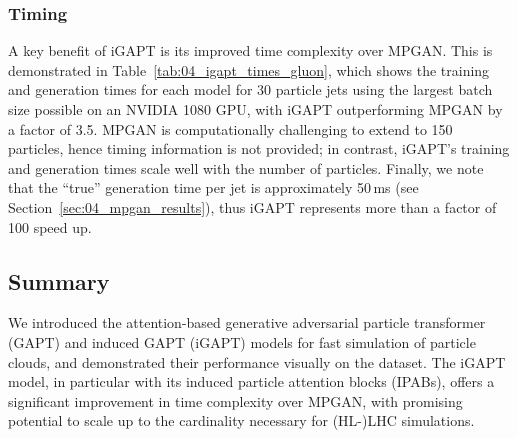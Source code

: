 \subsubsection{Timing} 

A key benefit of iGAPT is its improved time complexity over MPGAN.
This is demonstrated in Table~\ref{tab:04_igapt_times_gluon}, which shows the training and generation times for each model for 30 particle jets using the largest batch size possible on an NVIDIA 1080 GPU, with iGAPT outperforming MPGAN by a factor of 3.5.
MPGAN is computationally challenging to extend to 150 particles, hence timing information is not provided; in contrast, iGAPT's training and generation times scale well with the number of particles.
Finally, we note that the ``true'' generation time per jet is approximately 50\,ms (see Section~\ref{sec:04_mpgan_results}), thus iGAPT represents more than a factor of 100 speed up.


\begin{table}[htbp!]
\centering
\caption{Timing measurements for MPGAN and iGAPT, measured on an NVIDIA 1080 GPU.}
\label{tab:04_igapt_times_gluon}
\centering{}
\end{table}


\subsection{Summary}

We introduced the attention-based generative adversarial particle transformer (GAPT) and induced GAPT (iGAPT) models for fast simulation of particle clouds, and demonstrated their performance visually on the \jetnet dataset.
The iGAPT model, in particular with its induced particle attention blocks (IPABs), offers a significant improvement in time complexity over MPGAN, with promising potential to scale up to the cardinality necessary for (HL-)LHC simulations.

